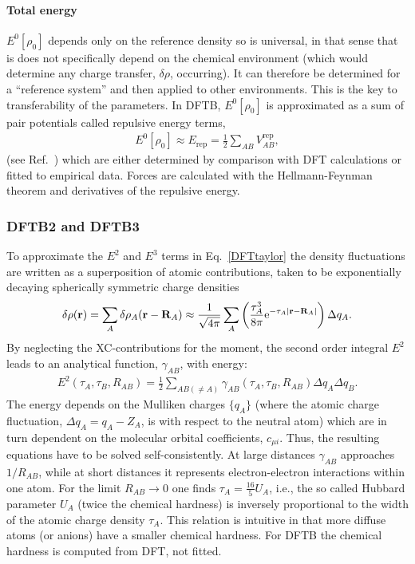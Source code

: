 \documentclass[reprint,onecolumn,superscriptaddress]{revtex4-1}
\begin{document}
\paragraph{Total energy}
$E^0[\rho_0]$ depends only on the reference density so is universal, in that
sense that is does not specifically depend on the chemical environment (which
would determine any charge transfer, $\delta \rho$, occurring). It can
therefore be determined for a ``reference system'' and then applied to other
environments. This is the key to transferability of the parameters. In DFTB,
$E^0[\rho_0]$ is approximated as a sum of pair potentials called repulsive
energy terms,
\begin{eqnarray}
  E^0[\rho_0] \approx E_\text{rep} = \frac{1}{2}\sum_{AB}V^{\text{rep}}_{AB},
  \label{eq:erep}
\end{eqnarray}
(see Ref.~\cite{Seifert2012}) which are either determined by comparison
with DFT calculations\cite{Porezag1995} or fitted to empirical
data.\cite{Gaus2009} Forces are calculated with the Hellmann-Feynman theorem and
derivatives of the repulsive energy.


\subsubsection{DFTB2 and DFTB3}
\label{sec:dftb2}
To approximate the $E^2$ and $E^3$ terms in Eq.~\eqref{DFTtaylor} the density
fluctuations are written as a superposition of atomic contributions,
taken to be exponentially decaying spherically symmetric charge densities
\begin{eqnarray}
  \delta\rho(\mathbf{r}) = \sum_A \delta \rho_A(\mathbf{r} - \mathbf{R}_A)
  \approx \frac{1}{\sqrt{4\pi}} \sum_A \left( \frac{\tau_A^3}{8\pi}
  \mathrm{e}^{-\tau_A|\mathbf{r}-\mathbf{R}_A|} \right) \Delta q_A \text.
\end{eqnarray}
By neglecting the XC-contributions for the moment, the second order integral
$E^2$ leads to an analytical function, $\gamma_{AB}$, with
energy:\cite{Elstner1998}
%
\begin{eqnarray}
  E^2(\tau_A,\tau_B,R_{AB}) = \frac{1}{2}\sum_{AB(\ne A)}
  \gamma_{AB}(\tau_A,\tau_B,R_{AB}) \Delta q_A \Delta q_B.\label{spin2}
\end{eqnarray}
%
The energy depends on the Mulliken charges $\{q_A\}$ (where the atomic charge
fluctuation, $\Delta q_A = q_A - Z_A$, is with respect to the neutral atom)
which are in turn dependent on the molecular orbital coefficients, $c_{\mu
  i}$. Thus, the resulting equations have to be solved self-consistently. At
large distances $\gamma_{AB}$ approaches $1/R_{AB}$, while at short distances it
represents electron-electron interactions within one atom.  For the limit
$R_{AB}\rightarrow 0$ one finds $\tau_A = \frac{16}{5} U_A$, i.e., the so called
Hubbard parameter $U_A$ (twice the chemical hardness) is inversely proportional
to the width of the atomic charge density $\tau_A$. This relation is intuitive
in that more diffuse atoms (or anions) have a smaller chemical hardness. For
DFTB the chemical hardness is computed from DFT, not fitted.
\end{document}
